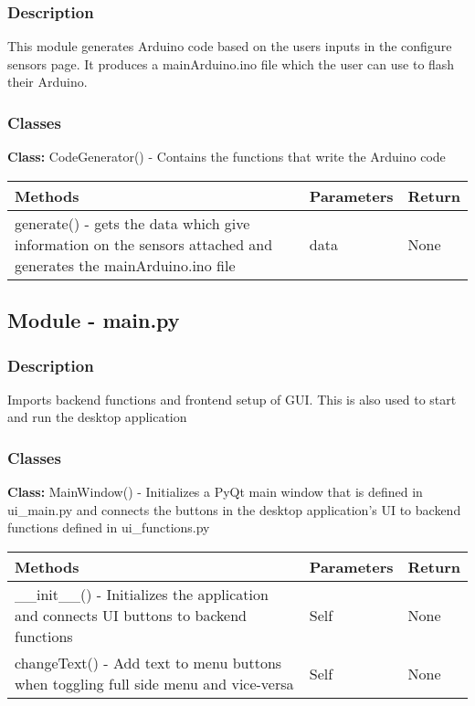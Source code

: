 \documentclass[12pt, titlepage]{article}
\begin{document}
  \subsubsection{Description}
  This module generates Arduino code based on the users inputs in the configure sensors page. It produces a mainArduino.ino file which the user can use to flash their Arduino.
  \subsubsection{Classes}
    \textbf{Class:} CodeGenerator() - Contains the functions that write the Arduino code \\
    
      \noindent \begin{tabular}{| p{} | p{}| p{}|}
        \hline
        \rowcolor[gray]{0.9}
        Methods & Parameters & Return\\
        \hline
        generate() - gets the data which give information on the sensors attached and generates the mainArduino.ino file  & data & None \\
        \hline
      \end{tabular}

\newpage
  \subsection{Module - main.py}

  \subsubsection{Description}
  Imports backend functions and frontend setup of GUI. This is also used to start and run the desktop application

  \subsubsection{Classes}
  \textbf{Class:} MainWindow() - Initializes a PyQt main window that is defined in ui\_main.py and connects the buttons in the desktop application’s UI to backend functions defined in ui\_functions.py \\

    \noindent \begin{tabular}{| p{} | p{}| p{}|}
      \hline
      \rowcolor[gray]{0.9}
      Methods & Parameters & Return\\
      \hline
      \_\_init\_\_() - Initializes the application and connects UI buttons to backend functions &  Self & None \\
      \hline
      changeText() - Add text to menu buttons when toggling full side menu and vice-versa & Self & None \\
      \hline
    \end{tabular}
\end{document}
